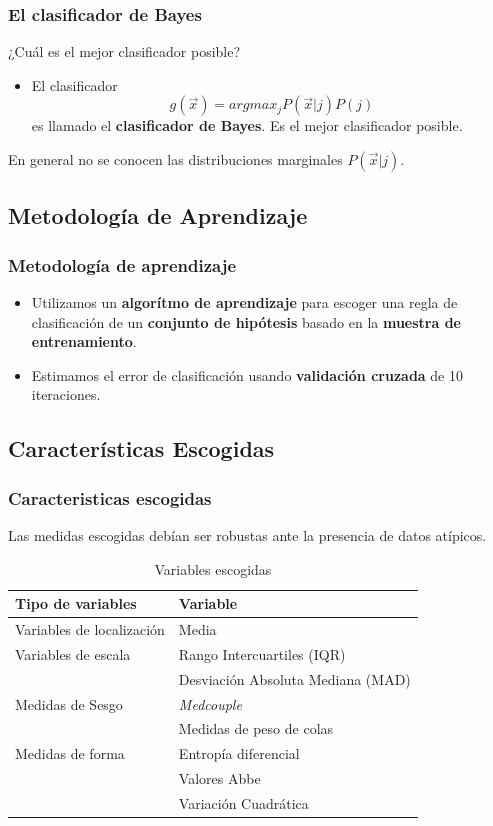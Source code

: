 \documentclass{beamer}
\begin{document}
\begin{frame}%
  \frametitle{El clasificador de Bayes}
  ¿Cuál es el mejor clasificador posible?
  \begin{itemize} 
  \item El clasificador
    \begin{equation}
      g(\vec{x}) = argmax_{j}P(\vec{x}|j)P(j)
    \end{equation}
    es llamado el \textbf{clasificador de Bayes}. Es el mejor clasificador posible.
  \end{itemize}
  En general no se conocen las distribuciones marginales $P(\vec{x}|j)$.
\end{frame}

\subsection{Metodología de Aprendizaje}
\begin{frame} %
  \frametitle{Metodología de aprendizaje}
  \begin{itemize}
  \item Utilizamos un \textbf{algorítmo de aprendizaje} para escoger una regla de clasificación de un \textbf{conjunto de hipótesis} basado en la \textbf{muestra de entrenamiento}.
  \item Estimamos el error de clasificación usando \textbf{validación cruzada} de 10 iteraciones.
  \end{itemize}
\end{frame}

\subsection{Características Escogidas}
\begin{frame}
\frametitle{Caracteristicas escogidas}
Las medidas escogidas debían ser robustas ante la presencia de datos atípicos.
\begin{table}
  \centering
  \begin{tabular}{ll}
    \hline
    Tipo de variables & Variable \\
    \hline
    Variables de localización & Media \\
    Variables de escala & Rango Intercuartiles (IQR) \\
    & Desviación Absoluta Mediana (MAD) \\
    Medidas de Sesgo & \textit{Medcouple} \\
    & Medidas de peso de colas \\
    Medidas de forma & Entropía diferencial \\
    & Valores Abbe \\
    & Variación Cuadrática
  \end{tabular}
  \caption{Variables escogidas}
\end{table}

\end{frame}
\end{document}
